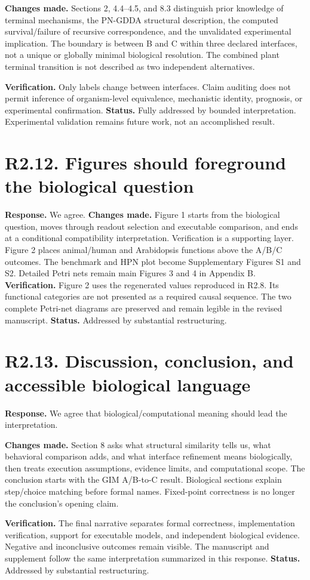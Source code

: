 \documentclass[11pt]{article}
\begin{document}
\textbf{Changes made.} Sections 2, 4.4--4.5, and 8.3 distinguish prior knowledge
of terminal mechanisms, the PN-GDDA structural description, the computed
survival/failure of recursive correspondence, and the unvalidated experimental
implication. The boundary is between B and C within three declared interfaces,
not a unique or globally minimal biological resolution. The combined plant
terminal transition is not described as two independent alternatives.

\textbf{Verification.} Only labels change between interfaces. Claim auditing
does not permit inference of organism-level equivalence, mechanistic identity,
prognosis, or experimental confirmation.
\textbf{Status.} Fully addressed by bounded interpretation. Experimental
validation remains future work, not an accomplished result.

\section*{R2.12. Figures should foreground the biological question}
\textbf{Response.} We agree.
\textbf{Changes made.} Figure 1 starts from the biological question, moves
through readout selection and executable comparison, and ends at a conditional
compatibility interpretation. Verification is a supporting layer. Figure 2
places animal/human and Arabidopsis functions above the A/B/C outcomes.
The benchmark and HPN plot become Supplementary Figures S1 and S2.
Detailed Petri nets remain main Figures 3 and 4 in Appendix B.
\textbf{Verification.} Figure 2 uses the regenerated values reproduced in R2.8.
Its functional categories are not presented as a required causal sequence.
The two complete Petri-net diagrams are preserved and remain legible in
the revised manuscript.
\textbf{Status.} Addressed by substantial restructuring.

\section*{R2.13. Discussion, conclusion, and accessible biological language}
\textbf{Response.} We agree that biological/computational meaning should lead
the interpretation.

\textbf{Changes made.} Section 8 asks what structural similarity tells us, what
behavioral comparison adds, and what interface refinement means biologically,
then treats execution assumptions, evidence limits, and computational scope.
The conclusion starts with the GIM A/B-to-C result. Biological sections explain
step/choice matching before formal names. Fixed-point correctness is no longer
the conclusion's opening claim.

\textbf{Verification.} The final narrative separates formal correctness,
implementation verification, support for executable models, and independent
biological evidence. Negative and inconclusive outcomes remain visible.
The manuscript and supplement follow the same interpretation summarized in
this response.
\textbf{Status.} Addressed by substantial restructuring.
\end{document}
